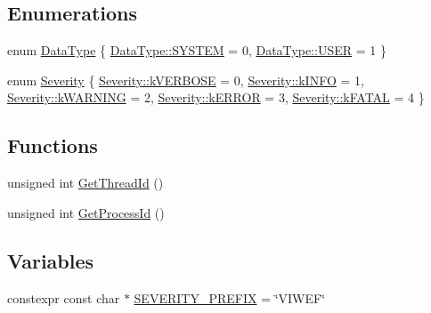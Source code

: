 \subsection*{Enumerations}
\begin{DoxyCompactItemize}
\item 
enum \mbox{\hyperlink{namespaceonnxruntime_1_1logging_a7342198e47b8ad2717a5d6e28cf68951}{Data\+Type}} \{ \mbox{\hyperlink{namespaceonnxruntime_1_1logging_a7342198e47b8ad2717a5d6e28cf68951afa177138f94a7ea01f549b1aa7893d03}{Data\+Type\+::\+S\+Y\+S\+T\+EM}} = 0, 
\mbox{\hyperlink{namespaceonnxruntime_1_1logging_a7342198e47b8ad2717a5d6e28cf68951a2e40ad879e955201df4dedbf8d479a12}{Data\+Type\+::\+U\+S\+ER}} = 1
 \}
\item 
enum \mbox{\hyperlink{namespaceonnxruntime_1_1logging_a7daeb33e1b0e6a6df8c23d142af78e81}{Severity}} \{ \newline
\mbox{\hyperlink{namespaceonnxruntime_1_1logging_a7daeb33e1b0e6a6df8c23d142af78e81af5194068f65bab5b3f2039fc3772b289}{Severity\+::k\+V\+E\+R\+B\+O\+SE}} = 0, 
\mbox{\hyperlink{namespaceonnxruntime_1_1logging_a7daeb33e1b0e6a6df8c23d142af78e81a8f2ea217769b142bf5c98407367240e1}{Severity\+::k\+I\+N\+FO}} = 1, 
\mbox{\hyperlink{namespaceonnxruntime_1_1logging_a7daeb33e1b0e6a6df8c23d142af78e81a512261ef71a8d03f67bc92ee37d0f609}{Severity\+::k\+W\+A\+R\+N\+I\+NG}} = 2, 
\mbox{\hyperlink{namespaceonnxruntime_1_1logging_a7daeb33e1b0e6a6df8c23d142af78e81a6fc5d11abe2153fff3b8b751b1ea2b38}{Severity\+::k\+E\+R\+R\+OR}} = 3, 
\newline
\mbox{\hyperlink{namespaceonnxruntime_1_1logging_a7daeb33e1b0e6a6df8c23d142af78e81a1c63f77c7926357cd7091bed7c77bcdb}{Severity\+::k\+F\+A\+T\+AL}} = 4
 \}
\end{DoxyCompactItemize}
\subsection*{Functions}
\begin{DoxyCompactItemize}
\item 
unsigned int \mbox{\hyperlink{namespaceonnxruntime_1_1logging_a259f82c4ed0446ffb25aede9f830eeb9}{Get\+Thread\+Id}} ()
\item 
unsigned int \mbox{\hyperlink{namespaceonnxruntime_1_1logging_a6958e73aa8c5b7142f5fd3eccf5039fb}{Get\+Process\+Id}} ()
\end{DoxyCompactItemize}
\subsection*{Variables}
\begin{DoxyCompactItemize}
\item 
constexpr const char $\ast$ \mbox{\hyperlink{namespaceonnxruntime_1_1logging_a672d734a6ea0a5e05020a46b1da93835}{S\+E\+V\+E\+R\+I\+T\+Y\+\_\+\+P\+R\+E\+F\+IX}} = \char`\"{}V\+I\+W\+EF\char`\"{}
\end{DoxyCompactItemize}


